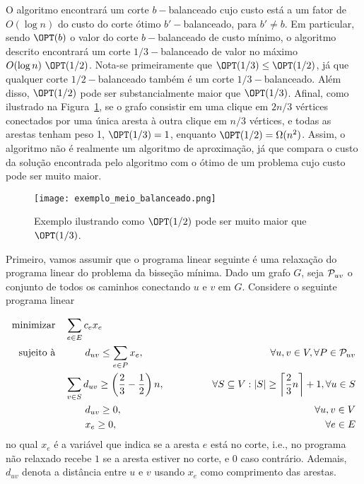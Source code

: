 \documentclass[12pt, a4paper]{article}
\begin{document}
O algoritmo encontrará um corte $b-$balanceado cujo custo está a um fator de $O(\log n)$ do custo do corte ótimo $b'-$balanceado, para $b' \neq b$.
Em particular, sendo $\OPT(b)$ o valor do corte $b-$balanceado de custo mínimo, o algoritmo descrito encontrará um corte $1/3-$balanceado de valor no máximo $O(\log n)\ \OPT(1/2)$.
Nota-se primeiramente que $\OPT(1/3) \leq \OPT(1/2)$, já que qualquer corte $1/2-$balanceado também é um corte $1/3-$balanceado.
Além disso, $\OPT(1/2)$ pode ser substancialmente maior que $\OPT(1/3)$. Afinal, como ilustrado na Figura~\ref{fig:exemplo_opt}, se o grafo consistir em uma clique em $2n/3$ vértices conectados por uma única aresta à outra clique em $n/3$ vértices, e todas as arestas tenham peso 1, $\OPT(1/3)=1$, enquanto $\OPT(1/2) = \Omega (n^2)$.
Assim, o algoritmo não é realmente um algoritmo de aproximação, já que compara o custo da solução encontrada pelo algoritmo com o ótimo de um problema cujo custo pode ser muito maior.

\begin{figure}[!htb]
\centering
\texttt{[image: exemplo\_meio\_balanceado.png]}
\caption{Exemplo ilustrando como $\OPT(1/2)$ pode ser muito maior que $\OPT(1/3)$.}
\label{fig:exemplo_opt}
\end{figure}

Primeiro, vamos assumir que o programa linear seguinte é uma relaxação do programa linear do problema da bisseção mínima.
Dado um grafo $G$, seja ${\cal P}_{u v}$ o conjunto de todos os caminhos conectando $u$ e $v$ em $G$. Considere o seguinte programa linear

\begin{alignat}{2}
\text{minimizar} & \quad \sum_{e \in E} c_{e} x_{e} \label{balancedcut_pl0}\\
\text{sujeito à} & \qquad \quad d_{u v} \leq \sum_{e \in P} x_e,
                    & \forall u, v \in V, \forall P \in {\cal P}_{u v} \label{balancedcut_pl1}\\
                 & \quad \sum_{v \in S} d_{u v} \geq \left( \frac{2}{3} - \frac{1}{2} \right) n, 
                    & \qquad\qquad \forall S \subseteq V : |S| \geq \left\lceil \frac{2}{3} n \right\rceil + 1, \forall u \in S \label{balancedcut_pl2}\\
                 & \qquad \quad d_{u v} \geq 0, 
                    & \forall u, v \in V \label{balancedcut_pl3}\\
                 & \qquad \quad x_e \geq 0,
                    & \forall e \in E \label{balancedcut_pl4}
\end{alignat}
no qual $x_e$ é a variável que indica se a aresta $e$ está no corte, i.e., no programa não relaxado recebe $1$ se a aresta estiver no corte, e $0$ caso contrário. Ademais, $d_{u v}$ denota a distância entre $u$ e $v$ usando $x_e$ como comprimento das arestas.
\end{document}
